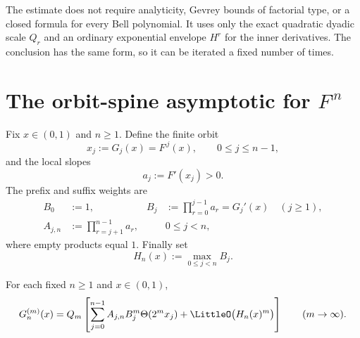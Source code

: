 \begin{remark}
The estimate does not require analyticity, Gevrey bounds of factorial type, or a
closed formula for every Bell polynomial.  It uses only the exact quadratic dyadic
scale $Q_r$ and an ordinary exponential envelope $H^r$ for the inner derivatives.
The conclusion has the same form, so it can be iterated a fixed number of times.
\end{remark}

\section[The orbit-spine asymptotic for compositional iterates]{The orbit-spine asymptotic for $F^{\comp n}$}
\label{ii:sec:spines}

Fix $x\in(0,1)$ and $n\geq1$.  Define the finite orbit
\begin{equation}
  x_j:=G_j(x)=F^{\comp j}(x),\qquad 0\leq j\leq n-1,
  \label{ii:eq:orbit}
\end{equation}
and the local slopes
\begin{equation}
  a_j:=F'(x_j)>0.
  \label{ii:eq:slopes}
\end{equation}
The prefix and suffix weights are
\begin{align}
 B_0&:=1,
 &B_j&:=\prod_{r=0}^{j-1}a_r=G_j'(x)\quad(j\geq1),
 \label{ii:eq:prefix}\\
 A_{j,n}&:=\prod_{r=j+1}^{n-1}a_r,
 &&0\leq j<n,
 \label{ii:eq:suffix}
\end{align}
where empty products equal $1$.  Finally set
\begin{equation}
 H_n(x):=\max_{0\leq j<n}B_j.
 \label{ii:eq:Hn}
\end{equation}

\begin{theorem}
\label{ii:thm:spine-expansion}
For each fixed $n\geq1$ and $x\in(0,1)$,
\begin{equation}
 G_n^{(m)}(x)
 =Q_m\left[
   \sum_{j=0}^{n-1}A_{j,n}B_j^m\ThetaF(2^m x_j)
   +\LittleO\bigl(H_n(x)^m\bigr)
 \right]
 \qquad(m\to\infty).
 \label{ii:eq:spine-expansion}
\end{equation}
\end{theorem}

